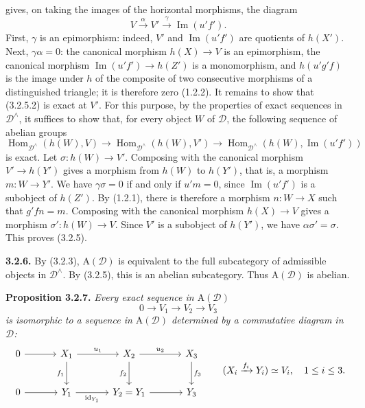 \clearpage
{}%
\begingroup\small\setlength{\parskip}{0pt}\setlength{\emergencystretch}{1.5em}
gives, on taking the images of the horizontal morphisms, the diagram
\[
V\xrightarrow{\alpha}V'\xrightarrow{\gamma}\operatorname{Im}(u'f').
\tag{3.2.5.2}
\]
First, $\gamma$ is an epimorphism: indeed, $V'$ and
$\operatorname{Im}(u'f')$ are quotients of $h(X')$. Next,
$\gamma\alpha=0$: the canonical morphism $h(X)\to V$ is an epimorphism, the
canonical morphism $\operatorname{Im}(u'f')\to h(Z')$ is a monomorphism, and
$h(u'g'f)$ is the image under $h$ of the composite of two consecutive
morphisms of a distinguished triangle; it is therefore zero (1.2.2). It
remains to show that (3.2.5.2) is exact at $V'$. For this purpose, by the
properties of exact sequences in $\mathcal D^\wedge$, it suffices to show
that, for every object $W$ of $\mathcal D$, the following sequence of
abelian groups
\[
\operatorname{Hom}_{\mathcal D^\wedge}(h(W),V)\longrightarrow
\operatorname{Hom}_{\mathcal D^\wedge}(h(W),V')\longrightarrow
\operatorname{Hom}_{\mathcal D^\wedge}(h(W),\operatorname{Im}(u'f'))
\]
is exact. Let $\sigma\colon h(W)\to V'$. Composing with the canonical
morphism $V'\to h(Y')$ gives a morphism from $h(W)$ to $h(Y')$, that is, a
morphism $m\colon W\to Y'$. We have $\gamma\sigma=0$ if and only if
$u'm=0$, since $\operatorname{Im}(u'f')$ is a subobject of $h(Z')$. By
(1.2.1), there is therefore a morphism $n\colon W\to X$ such that $g'fn=m$.
Composing with the canonical morphism $h(X)\to V$ gives a morphism
$\sigma'\colon h(W)\to V$. Since $V'$ is a subobject of $h(Y')$, we have
$\alpha\sigma'=\sigma$. This proves (3.2.5).

\medskip\noindent\textbf{3.2.6.}\quad
By (3.2.3), $\mathrm A(\mathcal D)$ is equivalent to the full subcategory of
admissible objects in $\mathcal D^\wedge$. By (3.2.5), this is an abelian
subcategory. Thus $\mathrm A(\mathcal D)$ is abelian.

\medskip\noindent\textbf{Proposition 3.2.7.}\quad
\textit{Every exact sequence in $\mathrm A(\mathcal D)$}
\[
0\longrightarrow V_1\longrightarrow V_2\longrightarrow V_3
\]
\textit{is isomorphic to a sequence in $\mathrm A(\mathcal D)$ determined
by a commutative diagram in $\mathcal D$:}
\[
\begin{tikzcd}[column sep=3.3em,row sep=2.4em]
0\arrow[r]&X_1\arrow[r,"u_1"]\arrow[d,"f_1"']&X_2\arrow[r,"u_2"]\arrow[d,"f_2"']&X_3\arrow[d,"f_3"]\\
0\arrow[r]&Y_1\arrow[r,"\operatorname{id}_{Y_1}"']&Y_2=Y_1\arrow[r]&Y_3
\end{tikzcd}
\qquad
(X_i\xrightarrow{f_i}Y_i)\simeq V_i,\quad1\leq i\leq3.
\]
\endgroup
